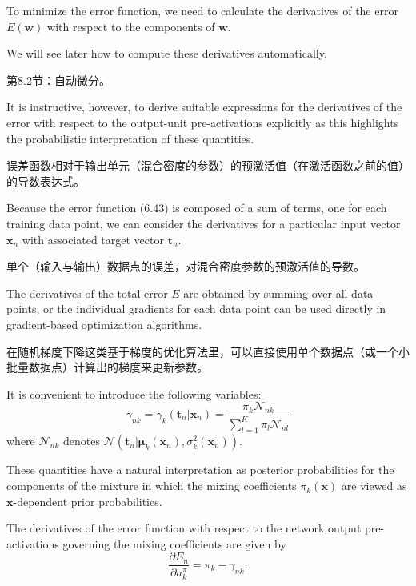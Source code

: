 \documentclass{article}
\begin{document}
To minimize the error function, we need to calculate the derivatives of the error $E(\mathbf{w})$ with respect to the components of $\mathbf{w}$. 

We will see later how to compute these derivatives automatically. 

{\color{red}
第8.2节：自动微分。
}

It is instructive, however, to derive suitable expressions for the derivatives of the error with respect to the output-unit pre-activations explicitly as this highlights the probabilistic interpretation of these quantities. 

{\color{red}
误差函数相对于输出单元（混合密度的参数）的预激活值（在激活函数之前的值）的导数表达式。
}

Because the error function (6.43) is composed of a sum of terms, one for each training data point, we can consider the derivatives for a particular input vector $\mathbf{x}_n$ with associated target vector $\mathbf{t}_n$. 

{\color{red}
单个（输入与输出）数据点的误差，对混合密度参数的预激活值的导数。
}

The derivatives of the total error $E$ are obtained by summing over all data points, or the individual gradients for each data point can be used directly in gradient-based optimization algorithms.

{\color{red}
在随机梯度下降这类基于梯度的优化算法里，可以直接使用单个数据点（或一个小批量数据点）计算出的梯度来更新参数。
}

It is convenient to introduce the following variables:
\begin{equation}
\gamma_{nk} = \gamma_k(\mathbf{t}_n|\mathbf{x}_n) = \frac{\pi_k \mathcal{N}_{nk}}{\sum_{l=1}^{K} \pi_l \mathcal{N}_{nl}}
\tag{6.44}
\end{equation}
where $\mathcal{N}_{nk}$ denotes $\mathcal{N}\left(\mathbf{t}_n \big| \boldsymbol{\mu}_k(\mathbf{x}_n), \sigma_k^2(\mathbf{x}_n) \right)$. 

These quantities have a natural interpretation as posterior probabilities for the components of the mixture in which the mixing coefficients $\pi_k(\mathbf{x})$ are viewed as $\mathbf{x}$-dependent prior probabilities.

The derivatives of the error function with respect to the network output pre-activations governing the mixing coefficients are given by
\begin{equation}
\frac{\partial E_n}{\partial a_k^\pi} = \pi_k - \gamma_{nk}.
\tag{6.45}
\end{equation}
\end{document}
